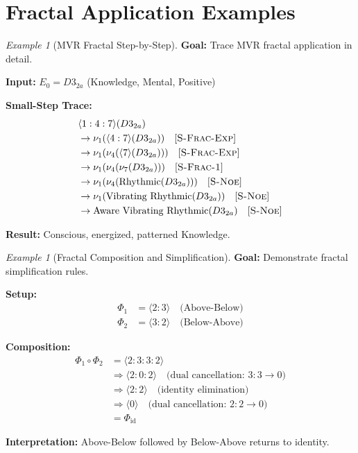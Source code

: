 \documentclass[11pt,twoside,openright]{book}
\theoremstyle{definition}
\theoremstyle{plain}
\theoremstyle{remark}
\newtheorem{example}[definition]{Example}
\newcommand{\noe}[1]{\nu_{#1}}
\newcommand{\Frac}{\Phi}
\newcommand{\id}{\mathrm{id}}
\newcommand{\smallstep}{\to}
\begin{document}
\section{Fractal Application Examples}

\begin{example}[MVR Fractal Step-by-Step]
\label{ex:mvr-stepbystep}
\textbf{Goal:} Trace MVR fractal application in detail.

\textbf{Input:} $E_0 = D3_{2a}$ (Knowledge, Mental, Positive)

\textbf{Small-Step Trace:}
\begin{align}
&\langle 1:4:7 \rangle(D3_{2a}) \\
&\smallstep \noe{1}(\langle 4:7 \rangle(D3_{2a})) \quad [\textsc{S-Frac-Exp}] \\
&\smallstep \noe{1}(\noe{4}(\langle 7 \rangle(D3_{2a}))) \quad [\textsc{S-Frac-Exp}] \\
&\smallstep \noe{1}(\noe{4}(\noe{7}(D3_{2a}))) \quad [\textsc{S-Frac-1}] \\
&\smallstep \noe{1}(\noe{4}(\text{Rhythmic}(D3_{2a}))) \quad [\textsc{S-Noe}] \\
&\smallstep \noe{1}(\text{Vibrating Rhythmic}(D3_{2a})) \quad [\textsc{S-Noe}] \\
&\smallstep \text{Aware Vibrating Rhythmic}(D3_{2a}) \quad [\textsc{S-Noe}]
\end{align}

\textbf{Result:} Conscious, energized, patterned Knowledge.
\end{example}

\begin{example}[Fractal Composition and Simplification]
\label{ex:frac-simplify}
\textbf{Goal:} Demonstrate fractal simplification rules.

\textbf{Setup:}
\begin{align}
\Frac_1 &= \langle 2:3 \rangle \quad \text{(Above-Below)} \\
\Frac_2 &= \langle 3:2 \rangle \quad \text{(Below-Above)}
\end{align}

\textbf{Composition:}
\begin{align}
\Frac_1 \circ \Frac_2 &= \langle 2:3:3:2 \rangle \\
&\Rightarrow \langle 2:0:2 \rangle \quad \text{(dual cancellation: } 3:3 \to 0) \\
&\Rightarrow \langle 2:2 \rangle \quad \text{(identity elimination)} \\
&\Rightarrow \langle 0 \rangle \quad \text{(dual cancellation: } 2:2 \to 0) \\
&= \Frac_{\id}
\end{align}

\textbf{Interpretation:} Above-Below followed by Below-Above returns to identity.
\end{example}
\end{document}
